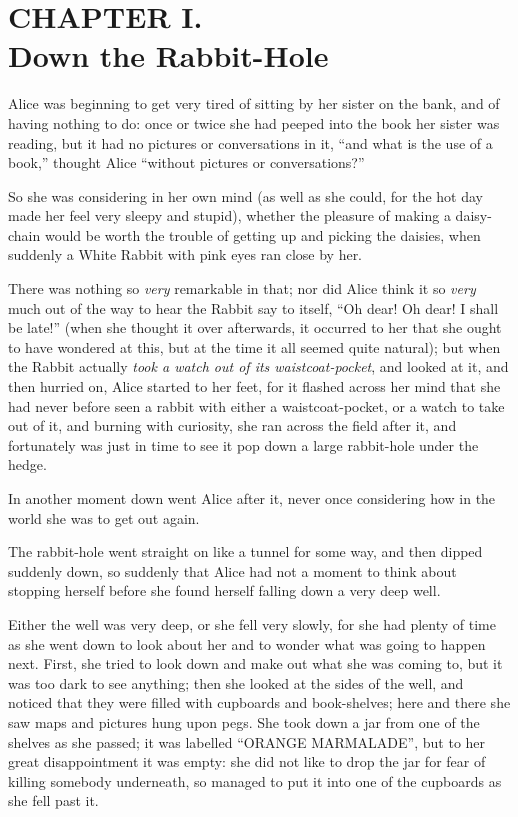 \documentclass[11pt,openany,oneside]{book}
\begin{document}
\clearpage{}
{}
\chapter*{CHAPTER I.\\  Down the Rabbit-Hole}
\leavevmode\hypertarget{d4.fp4363}{}Alice was beginning to get very tired of sitting by her sister on the bank, and of having nothing to do: once or twice she had peeped into the book her sister was reading, but it had no pictures or conversations in it, “and what is the use of a book,” thought Alice “without pictures or conversations?” 

So she was considering in her own mind (as well as she could, for the hot day made her feel very sleepy and stupid), whether the pleasure of making a daisy-chain would be worth the trouble of getting up and picking the daisies, when suddenly a White Rabbit with pink eyes ran close by her. 

There was nothing so {\em very\/} remarkable in that; nor did Alice think it so {\em very\/} much out of the way to hear the Rabbit say to itself, “Oh dear! Oh dear! I shall be late!” (when she thought it over afterwards, it occurred to her that she ought to have wondered at this, but at the time it all seemed quite natural); but when the Rabbit actually {\em took a watch out of its waistcoat-pocket\/}, and looked at it, and then hurried on, Alice started to her feet, for it flashed across her mind that she had never before seen a rabbit with either a waistcoat-pocket, or a watch to take out of it, and burning with curiosity, she ran across the field after it, and fortunately was just in time to see it pop down a large rabbit-hole under the hedge. 

In another moment down went Alice after it, never once considering how in the world she was to get out again. 

The rabbit-hole went straight on like a tunnel for some way, and then dipped suddenly down, so suddenly that Alice had not a moment to think about stopping herself before she found herself falling down a very deep well. 

Either the well was very deep, or she fell very slowly, for she had plenty of time as she went down to look about her and to wonder what was going to happen next. First, she tried to look down and make out what she was coming to, but it was too dark to see anything; then she looked at the sides of the well, and noticed that they were filled with cupboards and book-shelves; here and there she saw maps and pictures hung upon pegs. She took down a jar from one of the shelves as she passed; it was labelled “ORANGE MARMALADE”, but to her great disappointment it was empty: she did not like to drop the jar for fear of killing somebody underneath, so managed to put it into one of the cupboards as she fell past it. 
\end{document}
